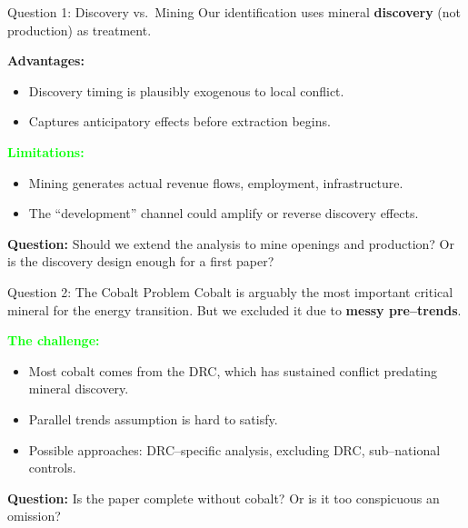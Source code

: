 \documentclass[aspectratio=169,11pt]{beamer}
\newcommand{\audience}[1]{%
  \vspace{0.5em}%
  {\color{lime}\textbf{Question:}} {\color{cream}#1}%
}
\begin{document}
\begin{frame}{Question 1: Discovery vs.\ Mining}
Our identification uses mineral \textbf{discovery} (not production) as treatment.

\vspace{0.5em}
\textcolor{sage}{\textbf{Advantages:}}
\begin{itemize}
    \item Discovery timing is plausibly exogenous to local conflict.
    \item Captures anticipatory effects before extraction begins.
\end{itemize}

\vspace{0.3em}
\textcolor{lime}{\textbf{Limitations:}}
\begin{itemize}
    \item Mining generates actual revenue flows, employment, infrastructure.
    \item The ``development'' channel could amplify or reverse discovery effects.
\end{itemize}

\vspace{0.5em}
\audience{Should we extend the analysis to mine openings and production? Or is the discovery design enough for a first paper?}
\end{frame}

\begin{frame}{Question 2: The Cobalt Problem}
Cobalt is arguably the most important critical mineral for the energy transition. But we excluded it due to \textbf{messy pre--trends}.

\vspace{0.5em}
\textcolor{lime}{\textbf{The challenge:}}
\begin{itemize}
    \item Most cobalt comes from the DRC, which has sustained conflict predating mineral discovery.
    \item Parallel trends assumption is hard to satisfy.
    \item Possible approaches: DRC--specific analysis, excluding DRC, sub--national controls.
\end{itemize}

\vspace{0.5em}
\audience{Is the paper complete without cobalt? Or is it too conspicuous an omission?}
\end{frame}
\end{document}
